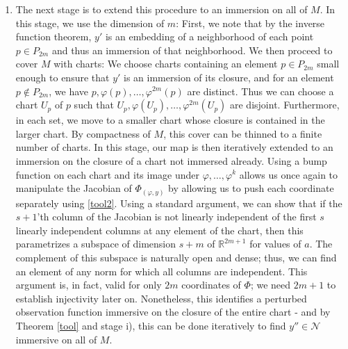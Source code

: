 \documentclass[11pt, a4paper]{memoir}
\theoremstyle{break}
\theoremstyle{break}
\theoremstyle{nonumberplain}
\newcommand{\mR}{\mathbb{R}}
\begin{document}
\begin{enumerate}[label=\roman*)]
	\item The next stage is to extend this procedure to an immersion on all of $M$. In this stage, we use the dimension of $m$: First, we note that by the inverse function theorem, $y'$ is an embedding of a neighborhood of each point $p\in P_{2m}$ and thus an immersion of that neighborhood. We then proceed to cover $M$ with charts:  We choose charts containing an element $p\in P_{2m}$ small enough to ensure that $y'$ is an immersion of its closure, and for an element $p\notin P_{2m}$, we have $p,\varphi(p),\ldots, \varphi^{2m}(p)$ are distinct. Thus we can choose a chart $U_p$ of $p$ such that $U_p,\varphi(U_p),\ldots, \varphi^{2m}(U_p)$ are disjoint. Furthermore, in each set, we move to a smaller chart whose closure is contained in the larger chart. By compactness of $M$, this cover can be thinned to a finite number of charts. In this stage, our map is then iteratively extended to an immersion on the closure of a chart not immersed already. Using a bump function on each chart and its image under $\varphi,\ldots,\varphi^k$ allows us once again to manipulate the Jacobian of $\Phi_{(\varphi,y)}$ by allowing us to push each coordinate separately using \ref{tool2}. Using a standard argument, we can show that if the $s+1$'th column of the Jacobian is not linearly independent of the first $s$ linearly independent columns at any element of the chart, then this parametrizes a subspace of dimension $s+m$ of $\mR^{2m+1}$ for values of $a$. The complement of this subspace is naturally open and dense; thus, we can find an element of any norm for which all columns are independent. This argument is, in fact, valid for only $2m$ coordinates of $\Phi$; we need $2m+1$ to establish injectivity later on. Nonetheless, this identifies a perturbed observation function immersive on the closure of the entire chart - and by Theorem \ref{tool} and stage i), this can be done iteratively to find $y''\in \mathcal{N}$ immersive on all of $M$.

\end{enumerate}
\end{document}
